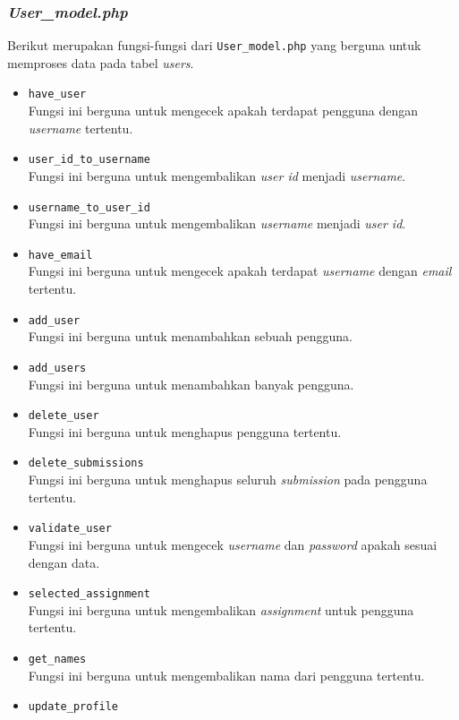 \subsubsection{\textit{User\_model.php}}
Berikut merupakan fungsi-fungsi dari \texttt{User\_model.php} yang berguna untuk memproses data pada tabel \textit{users}.
\begin{itemize}
	\item \texttt{have\_user}\\
	Fungsi ini berguna untuk mengecek apakah terdapat pengguna dengan \textit{username} tertentu.
	\item \texttt{user\_id\_to\_username}\\
	Fungsi ini berguna untuk mengembalikan \textit{user id} menjadi \textit{username}.
	\item \texttt{username\_to\_user\_id}\\
	Fungsi ini berguna untuk mengembalikan \textit{username} menjadi \textit{user id}.
	\item \texttt{have\_email}\\
	Fungsi ini berguna untuk mengecek apakah terdapat \textit{username} dengan \textit{email} tertentu.
	\item \texttt{add\_user}\\
	Fungsi ini berguna untuk menambahkan sebuah pengguna.
	\item \texttt{add\_users}\\
	Fungsi ini berguna untuk menambahkan banyak pengguna.
	\item \texttt{delete\_user}\\
	Fungsi ini berguna untuk menghapus pengguna tertentu.
	\item \texttt{delete\_submissions}\\
	Fungsi ini berguna untuk menghapus seluruh \textit{submission} pada pengguna tertentu.
	\item \texttt{validate\_user}\\
	Fungsi ini berguna untuk mengecek \textit{username} dan \textit{password} apakah sesuai dengan data.
	\item \texttt{selected\_assignment}\\
	Fungsi ini berguna untuk mengembalikan \textit{assignment} untuk pengguna tertentu.
	\item \texttt{get\_names}\\
	Fungsi ini berguna untuk mengembalikan nama dari pengguna tertentu.
	\item \texttt{update\_profile}\\

\end{itemize}

